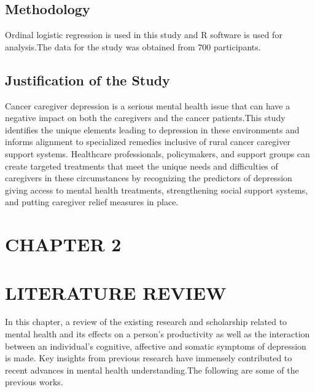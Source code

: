 \documentclass[12pt]{article}\usepackage[]{graphicx}\usepackage[]{xcolor}
\numberwithin{equation}{section}
\numberwithin{figure}{section}
\begin{document}
\subsection{Methodology}
Ordinal logistic regression is used in this study and R software is used for analysis.The data for the study was obtained from 700 participants.
\subsection{Justification of the Study}
	Cancer caregiver depression is a serious mental health issue that can have a negative impact on both the caregivers and the cancer patients.This study identifies the unique elements leading to depression in these environments and informs alignment to specialized remedies inclusive of rural cancer caregiver support systems. Healthcare professionals, policymakers, and support groups can create targeted treatments that meet the unique needs and difficulties of caregivers in these circumstances by recognizing the predictors of depression giving access to mental health treatments, strengthening social support systems, and putting caregiver relief measures in place.

\newpage
	\section*{CHAPTER 2}
	\section*{LITERATURE REVIEW}
	In this chapter, a review of the existing research and scholarship related to mental health and its effects on a person's productivity as well as the interaction between an individual's cognitive, affective and somatic symptoms of depression is made. Key insights from previous research have immensely contributed to recent advances in mental health understanding.The following are some of the previous works.\\
	
\end{document}
